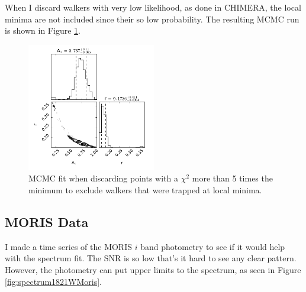 \documentclass[manuscript]{aastex6}
\begin{document}
When I discard walkers with very low likelihood, as done in CHIMERA, the local minima are not included since their so low probability.
The resulting MCMC run is shown in Figure \ref{fig:localMinExcludeCorner}.

\begin{figure}
\begin{centering}
\includegraphics[width=0.5\textwidth]{corner_lognormal_mie_no_lmin.pdf}
\caption{MCMC fit when discarding points with a $\chi^2$ more than 5 times the minimum to exclude walkers that were trapped at local minima.}\label{fig:localMinExcludeCorner}
\end{centering}
\end{figure}

\clearpage
\pagebreak
\subsection{MORIS Data}

I made a time series of the MORIS $i$ band photometry to see if it would help with the spectrum fit.
The SNR is so low that's it hard to see any clear pattern.
However, the photometry can put upper limits to the spectrum, as seen in Figure \ref{fig:spectrum1821WMoris}.
\end{document}

